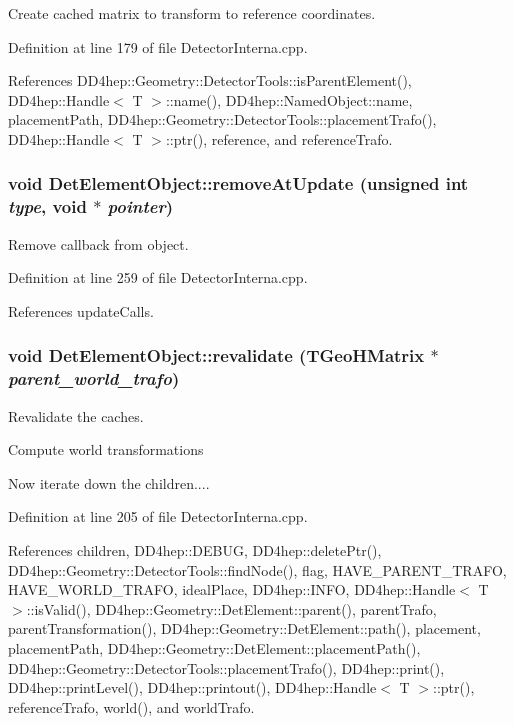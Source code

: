 Create cached matrix to transform to reference coordinates. 

Definition at line 179 of file DetectorInterna.cpp.

References DD4hep::Geometry::DetectorTools::isParentElement(), DD4hep::Handle$<$ T $>$::name(), DD4hep::NamedObject::name, placementPath, DD4hep::Geometry::DetectorTools::placementTrafo(), DD4hep::Handle$<$ T $>$::ptr(), reference, and referenceTrafo.\hypertarget{class_d_d4hep_1_1_geometry_1_1_det_element_object_ad0d107dfcc7629eb1009cde63e24981b}{
\subsubsection[{removeAtUpdate}]{\setlength{\rightskip}{0pt plus 5cm}void DetElementObject::removeAtUpdate (unsigned int {\em type}, \/  void $\ast$ {\em pointer})}}
\label{class_d_d4hep_1_1_geometry_1_1_det_element_object_ad0d107dfcc7629eb1009cde63e24981b}


Remove callback from object. 

Definition at line 259 of file DetectorInterna.cpp.

References updateCalls.\hypertarget{class_d_d4hep_1_1_geometry_1_1_det_element_object_a30a0085da8a1ef8d1253b37e494df066}{
\subsubsection[{revalidate}]{\setlength{\rightskip}{0pt plus 5cm}void DetElementObject::revalidate (TGeoHMatrix $\ast$ {\em parent\_\-world\_\-trafo})}}
\label{class_d_d4hep_1_1_geometry_1_1_det_element_object_a30a0085da8a1ef8d1253b37e494df066}


Revalidate the caches. 

Compute world transformations

Now iterate down the children.... 

Definition at line 205 of file DetectorInterna.cpp.

References children, DD4hep::DEBUG, DD4hep::deletePtr(), DD4hep::Geometry::DetectorTools::findNode(), flag, HAVE\_\-PARENT\_\-TRAFO, HAVE\_\-WORLD\_\-TRAFO, idealPlace, DD4hep::INFO, DD4hep::Handle$<$ T $>$::isValid(), DD4hep::Geometry::DetElement::parent(), parentTrafo, parentTransformation(), DD4hep::Geometry::DetElement::path(), placement, placementPath, DD4hep::Geometry::DetElement::placementPath(), DD4hep::Geometry::DetectorTools::placementTrafo(), DD4hep::print(), DD4hep::printLevel(), DD4hep::printout(), DD4hep::Handle$<$ T $>$::ptr(), referenceTrafo, world(), and worldTrafo.

